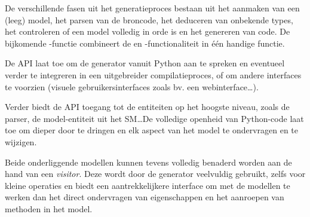 De verschillende fasen uit het generatieproces bestaan uit het aanmaken van een
(leeg) model, het parsen van de broncode, het deduceren van onbekende types,
het controleren of een model volledig in orde is en het genereren van code. De
bijkomende -functie combineert de  en
-functionaliteit in \'e\'en handige functie.

De API laat toe om de generator vanuit Python aan te spreken en eventueel
verder te integreren in een uitgebreider compilatieproces, of om andere
interfaces te voorzien (visuele gebruikersinterfaces zoals bv. een
webinterface\dots).

Verder biedt de API toegang tot de entiteiten op het hoogste niveau, zoals de
parser, de model-entiteit uit het SM\dots De volledige openheid van Python-code
laat toe om dieper door te dringen en elk aspect van het model te ondervragen
en te wijzigen.

Beide onderliggende modellen kunnen tevens volledig benaderd worden aan de hand
van een \emph{visitor}. Deze wordt door de generator veelvuldig gebruikt, zelfs
voor kleine operaties en biedt een aantrekkelijkere interface om met de
modellen te werken dan het direct ondervragen van eigenschappen en het
aanroepen van methoden in het model.
